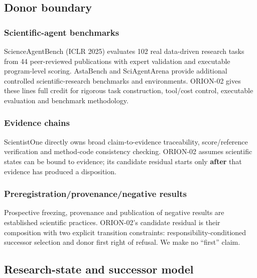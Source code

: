 \documentclass[preprint,12pt]{elsarticle}
\begin{document}
\hypertarget{donor-boundary}{%
\subsection{Donor boundary}\label{donor-boundary}}

\hypertarget{scientific-agent-benchmarks}{%
\subsubsection{Scientific-agent
benchmarks}\label{scientific-agent-benchmarks}}

ScienceAgentBench (ICLR 2025) evaluates 102 real data-driven research
tasks from 44 peer-reviewed publications with expert validation and
executable program-level scoring. AstaBench and SciAgentArena provide
additional controlled scientific-research benchmarks and environments.
ORION-02 gives these lines full credit for rigorous task construction,
tool/cost control, executable evaluation and benchmark methodology.

\hypertarget{evidence-chains}{%
\subsubsection{Evidence chains}\label{evidence-chains}}

ScientistOne directly owns broad claim-to-evidence traceability,
score/reference verification and method-code consistency checking.
ORION-02 assumes scientific states can be bound to evidence; its
candidate residual starts only \textbf{after} that evidence has produced
a disposition.

\hypertarget{preregistrationprovenancenegative-results}{%
\subsubsection{Preregistration/provenance/negative
results}\label{preregistrationprovenancenegative-results}}

Prospective freezing, provenance and publication of negative results are
established scientific practices. ORION-02's candidate residual is their
composition with two explicit transition constraints:
responsibility-conditioned successor selection and donor first right of
refusal. We make no ``first'' claim.

\hypertarget{research-state-and-successor-model}{%
\subsection{Research-state and successor
model}\label{research-state-and-successor-model}}
\end{document}
